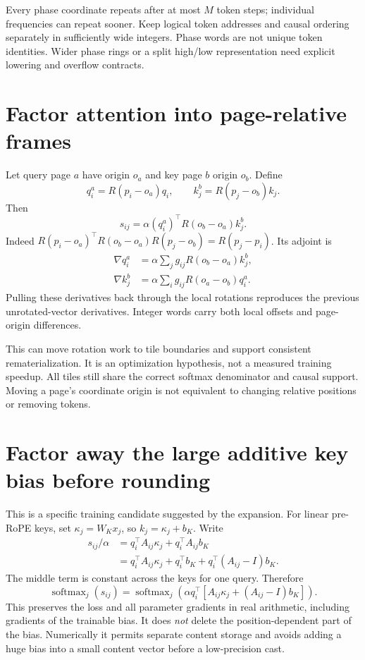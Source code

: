 \documentclass[11pt]{article}
\newcommand{\sm}{\operatorname{softmax}}
\begin{document}
Every phase coordinate repeats after at most $M$ token steps; individual frequencies can repeat sooner. Keep logical token addresses and causal ordering separately in sufficiently wide integers. Phase words are not unique token identities. Wider phase rings or a split high/low representation need explicit lowering and overflow contracts.

\section{Factor attention into page-relative frames}

Let query page $a$ have origin $o_a$ and key page $b$ origin $o_b$. Define
\begin{equation}
 q_i^a=R(p_i-o_a)q_i,\qquad k_j^b=R(p_j-o_b)k_j.
\end{equation}
Then
\begin{equation}
 s_{ij}=\alpha(q_i^a)^\top R(o_b-o_a)k_j^b.
\end{equation}
Indeed $R(p_i-o_a)^\top R(o_b-o_a)R(p_j-o_b)=R(p_j-p_i)$. Its adjoint is
\begin{align}
 \nabla q_i^a&=\alpha\sum_j g_{ij}R(o_b-o_a)k_j^b,\\
 \nabla k_j^b&=\alpha\sum_i g_{ij}R(o_a-o_b)q_i^a.
\end{align}
Pulling these derivatives back through the local rotations reproduces the previous unrotated-vector derivatives. Integer words carry both local offsets and page-origin differences.

This can move rotation work to tile boundaries and support consistent rematerialization. It is an optimization hypothesis, not a measured training speedup. All tiles still share the correct softmax denominator and causal support. Moving a page's coordinate origin is not equivalent to changing relative positions or removing tokens.

\section{Factor away the large additive key bias before rounding}

This is a specific training candidate suggested by the expansion. For linear pre-RoPE keys, set $\kappa_j=W_Kx_j$, so $k_j=\kappa_j+b_K$. Write
\begin{align}
 s_{ij}/\alpha
 &=q_i^\top A_{ij}\kappa_j+q_i^\top A_{ij}b_K\\
 &=q_i^\top A_{ij}\kappa_j+q_i^\top b_K
   +q_i^\top(A_{ij}-I)b_K.
\end{align}
The middle term is constant across the keys for one query. Therefore
\begin{equation}
 \sm_j(s_{ij})=\sm_j\left(\alpha q_i^\top
 [A_{ij}\kappa_j+(A_{ij}-I)b_K]\right).
\end{equation}
This preserves the loss and all parameter gradients in real arithmetic, including gradients of the trainable bias. It does \emph{not} delete the position-dependent part of the bias. Numerically it permits separate content storage and avoids adding a huge bias into a small content vector before a low-precision cast.
\end{document}
